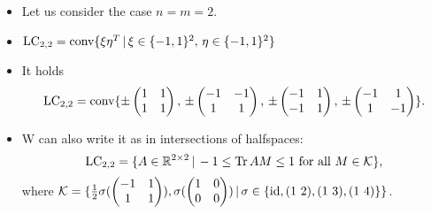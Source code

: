 \begin{frame}
	\begin{itemize}
		\item<1-> Let us consider the case $ n=m=2 $.
		\item<2-> {\footnotesize  $ \textup{LC}_{2,2} =\textup{conv} \{ \xi \eta^T \, | \, \xi \in \{ -1,1 \}^2, \, \eta \in \{ -1,1 \}^2 \} $}
		\item <2-> It holds 
		\begin{align*}
		\textup{LC}_{2,2}= \textup{conv} \{ \pm \begin{pmatrix}
		1 & 1 \\
		1 & 1
		\end{pmatrix} , \, \pm \begin{pmatrix}
		-1 & -1 \\
		1 & 1
		\end{pmatrix} , \, \pm \begin{pmatrix}
		-1 & 1 \\
		-1 & 1
		\end{pmatrix}, \, \pm \begin{pmatrix}
		-1 & 1 \\
		1 & -1
		\end{pmatrix}  \}.
		\end{align*}
		\item<3->
		W can also write it as in intersections of halfspaces: 
			\begin{equation}\label{facetsLC}
			\textup{LC}_{2,2} = \{ A \in \mathbb{R}^{2 \times 2} \, | \, -1 \le  \textup{Tr} \, {AM}  \le 1 \textup{ for all } M \in \mathcal{K} \},
			\end{equation}
			where $ \mathcal{K}  = \{ \frac{1}{2}\sigma(\begin{pmatrix}
			-1 & 1 \\
			1 & 1
			\end{pmatrix}), \sigma(\begin{pmatrix}
			1 & 0 \\
			0 & 0
			\end{pmatrix}) \, | \,  \sigma \in \{ \textup{id}, (1 \, \, 2), (1 \, \, 3), (1 \, \, 4) \} \} $.
		\end{itemize}
\end{frame}


